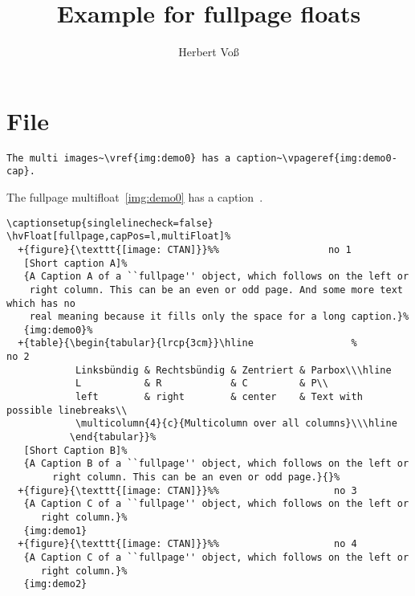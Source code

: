 \documentclass{scrartcl}
\begin{document}
\title{Example for fullpage floats}
\author{Herbert Voß}
\maketitle

\tableofcontents

\blinddocument

\section{File \texttt{\jobname}}

\begin{lstlisting}
The multi images~\vref{img:demo0} has a caption~\vpageref{img:demo0-cap}.
\end{lstlisting}

The fullpage multifloat~\vref{img:demo0} has a caption~.


\begin{lstlisting}
\captionsetup{singlelinecheck=false}
\hvFloat[fullpage,capPos=l,multiFloat]%
  +{figure}{\texttt{[image: CTAN]}}%%                   no 1
   [Short caption A]%
   {A Caption A of a ``fullpage'' object, which follows on the left or
    right column. This can be an even or odd page. And some more text which has no
    real meaning because it fills only the space for a long caption.}%
   {img:demo0}%
  +{table}{\begin{tabular}{lrcp{3cm}}\hline                 %             no 2
            Linksbündig & Rechtsbündig & Zentriert & Parbox\\\hline
            L           & R            & C         & P\\
            left        & right        & center    & Text with possible linebreaks\\
            \multicolumn{4}{c}{Multicolumn over all columns}\\\hline
           \end{tabular}}%
   [Short Caption B]%
   {A Caption B of a ``fullpage'' object, which follows on the left or
        right column. This can be an even or odd page.}{}%
  +{figure}{\texttt{[image: CTAN]}}%%                    no 3
   {A Caption C of a ``fullpage'' object, which follows on the left or
      right column.}%
   {img:demo1}
  +{figure}{\texttt{[image: CTAN]}}%%                    no 4
   {A Caption C of a ``fullpage'' object, which follows on the left or
      right column.}%
   {img:demo2}
\end{lstlisting}
\end{document}
